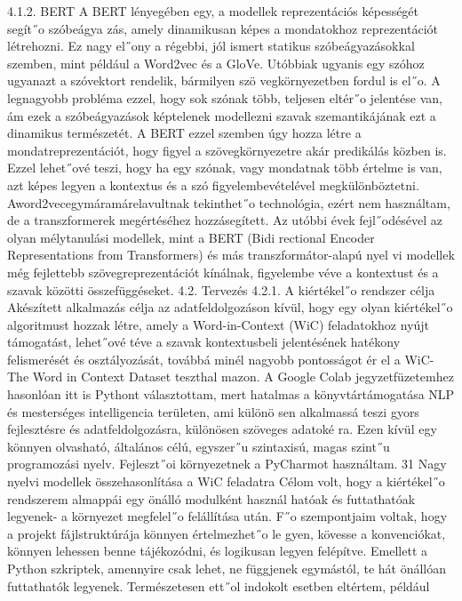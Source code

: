 \documentclass[12pt]{report}
\theoremstyle{definition}
\begin{document}
 4.1.2. BERT
 A BERT lényegében egy, a modellek reprezentációs képességét segít˝o szóbeágya
zás, amely dinamikusan képes a mondatokhoz reprezentációt létrehozni. Ez nagy el˝ony
 a régebbi, jól ismert statikus szóbeágyazásokkal szemben, mint például a Word2vec és
 a GloVe. Utóbbiak ugyanis egy szóhoz ugyanazt a szóvektort rendelik, bármilyen szö
vegkörnyezetben fordul is el˝o. A legnagyobb probléma ezzel, hogy sok szónak több,
 teljesen eltér˝o jelentése van, ám ezek a szóbeágyazások képtelenek modellezni szavak
 szemantikájának ezt a dinamikus természetét. A BERT ezzel szemben úgy hozza létre a
 mondatreprezentációt, hogy figyel a szövegkörnyezetre akár predikálás közben is. Ezzel
 lehet˝ové teszi, hogy ha egy szónak, vagy mondatnak több értelme is van, azt képes legyen
 a kontextus és a szó figyelembevételével megkülönböztetni.
 Aword2vecegymáramárelavultnak tekinthet˝o technológia, ezért nem használtam,
 de a transzformerek megértéséhez hozzásegített.
 Az utóbbi évek fejl˝odésével az olyan mélytanulási modellek, mint a BERT (Bidi
rectional Encoder Representations from Transformers) és más transzformátor-alapú nyel
vi modellek még fejlettebb szövegreprezentációt kínálnak, figyelembe véve a kontextust
 és a szavak közötti összefüggéseket.
 4.2. Tervezés
 4.2.1. A kiértékel˝o rendszer célja
 Akészített alkalmazás célja az adatfeldolgozáson kívül, hogy egy olyan kiértékel˝o
 algoritmust hozzak létre, amely a Word-in-Context (WiC) feladatokhoz nyújt támogatást,
 lehet˝ové téve a szavak kontextusbeli jelentésének hatékony felismerését és osztályozását,
 továbbá minél nagyobb pontosságot ér el a WiC- The Word in Context Dataset teszthal
mazon. A Google Colab jegyzetfüzetemhez hasonlóan itt is Pythont választottam, mert
 hatalmas a könyvtártámogatása NLP és mesterséges intelligencia területen, ami különö
sen alkalmassá teszi gyors fejlesztésre és adatfeldolgozásra, különösen szöveges adatoké
ra. Ezen kívül egy könnyen olvasható, általános célú, egyszer˝u szintaxisú, magas szint˝u
 programozási nyelv. Fejleszt˝oi környezetnek a PyCharmot használtam.
 31
Nagy nyelvi modellek összehasonlítása a WiC feladatra
 Célom volt, hogy a kiértékel˝o rendszerem almappái egy önálló modulként használ
hatóak és futtathatóak legyenek- a környezet megfelel˝o felállítása után.
 F˝o szempontjaim voltak, hogy a projekt fájlstruktúrája könnyen értelmezhet˝o le
gyen, kövesse a konvenciókat, könnyen lehessen benne tájékozódni, és logikusan legyen
 felépítve. Emellett a Python szkriptek, amennyire csak lehet, ne függjenek egymástól, te
hát önállóan futtathatók legyenek. Természetesen ett˝ol indokolt esetben eltértem, például
\end{document}
